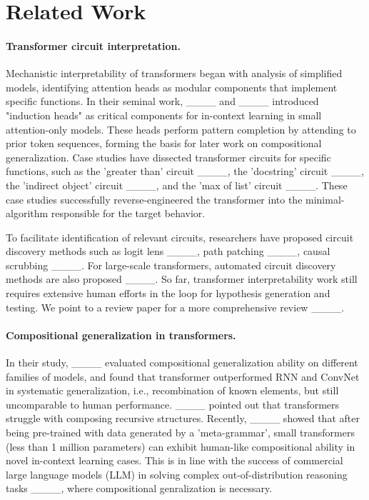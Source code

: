 \section{Related Work}
\label{appendix0}




\paragraph{Transformer circuit interpretation.}
Mechanistic interpretability of transformers began with analysis of simplified models, identifying attention heads as modular components that implement specific functions. In their seminal work, ____ and ____ introduced "induction heads" as critical components for in-context learning in small attention-only models. These heads perform pattern completion by attending to prior token sequences, forming the basis for later work on compositional generalization. Case studies have dissected transformer circuits for specific functions, such as the 'greater than' circuit ____, the 'docstring' circuit ____, the 'indirect object' circuit ____, and the 'max of list' circuit ____. These case studies successfully reverse-engineered the transformer into the minimal-algorithm responsible for the target behavior.

To facilitate identification of relevant circuits, researchers have proposed circuit discovery methods such as logit lens ____, path patching ____, causal scrubbing ____.   For large-scale transformers, automated circuit discovery methods are also proposed ____. So far, transformer interpretability work still requires extensive human efforts in the loop for hypothesis generation and testing. We point to a review paper for a more comprehensive review ____.

\paragraph{Compositional generalization in transformers.} In their study, ____ evaluated compositional generalization ability on different families of models, and found that transformer outperformed RNN and ConvNet in systematic generalization, i.e., recombination of known elements, but still uncomparable to human performance.  ____ pointed out that transformers struggle with composing recursive structures. Recently, ____ showed that after being pre-trained with data generated by a 'meta-grammar', small transformers (less than 1 million parameters) can exhibit human-like compositional ability in novel in-context learning cases. This is in line with the success of commercial large language models (LLM) in solving complex out-of-distribution reasoning tasks ____, where compositional genralization is necessary. 

